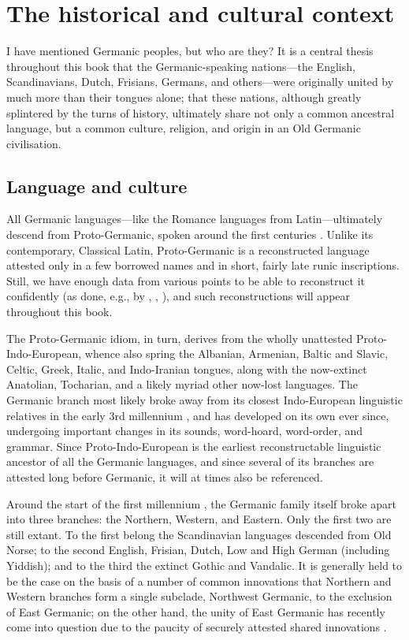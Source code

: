 \section{The historical and cultural context}

  I have mentioned Germanic peoples, but who are they?  It is a central thesis throughout this book that the Germanic-speaking nations---the English, Scandinavians, Dutch, Frisians, Germans, and others---were originally united by much more than their tongues alone; that these nations, although greatly splintered by the turns of history, ultimately share not only a common ancestral language, but a common culture, religion, and origin in an Old Germanic civilisation.

  \subsection{Language and culture}

  All Germanic languages---like the Romance languages from Latin---ulti\-mately descend from Proto-Germanic, spoken around the first centuries \ce.  Unlike its contemporary, Classical Latin, Proto-Germanic is a reconstructed language attested only in a few borrowed names and in short, fairly late runic inscriptions.  Still, we have enough data from various points to be able to reconstruct it confidently (as done, e.g., by \cite{Orel2003}, \cite{Kroonen2013}, \cite{Ringe2017}), and such reconstructions will appear throughout this book.

  The Proto-Germanic idiom, in turn, derives from the wholly unattested Proto-Indo-European, whence also spring the Albanian, Armenian, Baltic and Slavic, Celtic, Greek, Italic, and Indo-Iranian tongues, along with the now-extinct Anatolian, Tocharian, and a likely myriad other now-lost languages.  The Germanic branch most likely broke away from its closest Indo-European linguistic relatives in the early 3rd millennium \bce, and has developed on its own ever since, undergoing important changes in its sounds, word-hoard, word-order, and grammar.  Since Proto-Indo-European is the earliest reconstructable linguistic ancestor of all the Germanic languages, and since several of its branches are attested long before Germanic, it will at times also be referenced.

  Around the start of the first millennium \ce, the Germanic family itself broke apart into three branches: the Northern, Western, and Eastern.  Only the first two are still extant.  To the first belong the Scandinavian languages descended from Old Norse; to the second English, Frisian, Dutch, Low and High German (including Yiddish); and to the third the extinct Gothic and Vandalic.  It is generally held to be the case on the basis of a number of common innovations that Northern and Western branches form a single subclade, Northwest Germanic, to the exclusion of East Germanic; on the other hand, the unity of East Germanic has recently come into question due to the paucity of securely attested shared innovations \parencite{Kim2024}.


